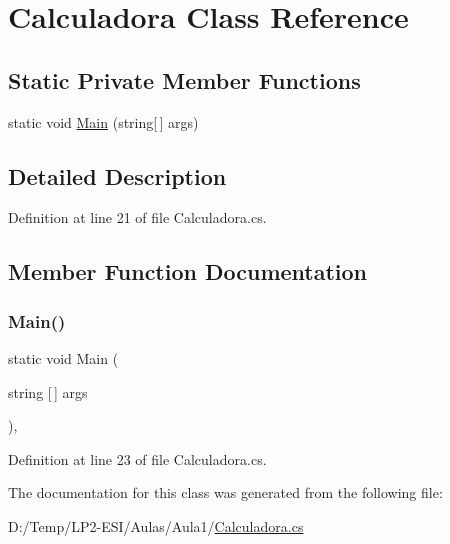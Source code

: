\hypertarget{classAula1_1_1Calculadora}{}\section{Calculadora Class Reference}
\label{classAula1_1_1Calculadora}
\subsection*{Static Private Member Functions}
\begin{DoxyCompactItemize}
\item 
static void \mbox{\hyperlink{classAula1_1_1Calculadora_a25f94f55e8993781b6a82d5eb88ea252}{Main}} (string\mbox{[}$\,$\mbox{]} args)
\end{DoxyCompactItemize}


\subsection{Detailed Description}


Definition at line 21 of file Calculadora.\+cs.



\subsection{Member Function Documentation}
\mbox{\label{classAula1_1_1Calculadora_a25f94f55e8993781b6a82d5eb88ea252}} 
\subsubsection{\texorpdfstring{Main()}{Main()}}
{\footnotesize\ttfamily static void Main (\begin{DoxyParamCaption}\item[{string \mbox{[}$\,$\mbox{]}}]{args }\end{DoxyParamCaption})\hspace{0.3cm}{\ttfamily [static]}, {\ttfamily [private]}}



Definition at line 23 of file Calculadora.\+cs.



The documentation for this class was generated from the following file\+:\begin{DoxyCompactItemize}
\item 
D\+:/\+Temp/\+L\+P2-\/\+E\+S\+I/\+Aulas/\+Aula1/\mbox{\hyperlink{Calculadora_8cs}{Calculadora.\+cs}}\end{DoxyCompactItemize}
